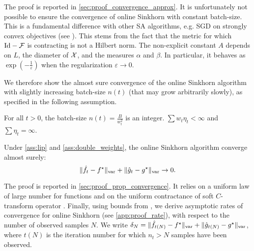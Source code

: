 The proof is reported in \autoref{sec:proof_convergence_approx}. It is unfortunately not possible
to ensure the convergence of online Sinkhorn with constant batch-size. This is a
fundamental difference with other SA algorithms, e.g. SGD on strongly convex
objectives (see \cite{moulines_non-asymptotic_2011}). This stems from the fact
that the metric for which $\text{Id} - \mathcal{F}$ is contracting is
not a Hilbert norm. The non-explicit constant $A$ depends on $L$, the diameter of $\mathcal{X}$, and the measures $\alpha$ and
$\beta$. In particular, it behaves as $\exp(-\frac{1}{\varepsilon})$ when the
regularization $\varepsilon \to 0$.
% 

We therefore show the almost sure convergence of the online Sinkhorn algorithm
with slightly increasing batch-size $n(t)$ (that may grow arbitrarily slowly), as specified in the following
assumption.

\begin{assumption}\label{ass:double_weights}
    For all $t > 0$, the batch-size $n(t) = \frac{B}{w_t^2}$ is an integer. $\sum w_t \eta_t <
    \infty$ and $\sum \eta_t = \infty$.
\end{assumption}

\begin{proposition}\label{prop:convergence_true}
    Under \autoref{ass:lip} and
    \ref{ass:double_weights}, the online Sinkhorn algorithm converge almost surely:
    \begin{equation}
        \Vert \hat f_t - f^\star \Vert_{\text{\upshape var}} + \Vert \hat g_t - g^\star \Vert_{\text{\upshape var}} \to 0.
    \end{equation}
\end{proposition}

The proof is reported in \autoref{sec:proof_prop_convergence}. It relies on a uniform
law of large number for functions \citep[][chapter
19]{van_der_vaart_asymptotic_2000} and on the uniform contractance of soft
$C$-transform operator \citep[e.g.][Proposition 19]{vialard2019elementary}. Finally, using bounds from \cite{moulines_non-asymptotic_2011}, we derive  asymptotic rates of convergence for online Sinkhorn (see \autoref{app:proof_rate}), with
respect to the number of observed samples $N$. We write $\delta_N = \Vert \hat
f_{t(N)} - f^\star \Vert_{\text{\upshape var}} + \Vert \hat g_{t(N)} - g^\star \Vert_{\text{\upshape var}}$,
where $t(N)$ is the iteration number for which $n_t > N$ samples have been observed.

